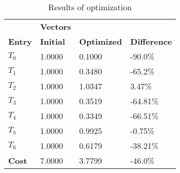 \begin{table}[h!]
\centering
\begin{tabular}{llll}
\textbf{}      & \cellcolor[HTML]{EFEFEF}\textbf{Vectors} & \textbf{} & \textbf{}         \\
\rowcolor[HTML]{EFEFEF} 
\textbf{Entry} & \textbf{Initial} & \textbf{Optimized} & \textbf{Difference} \\
$T_0$ & 1.0000 & 0.1000 & -90.0\% \\ 
$T_1$ & 1.0000 & 0.3480 & -65.2\% \\ 
$T_2$ & 1.0000 & 1.0347 & 3.47\% \\ 
$T_3$ & 1.0000 & 0.3519 & -64.81\% \\ 
$T_4$ & 1.0000 & 0.3349 & -66.51\% \\ 
$T_5$ & 1.0000 & 0.9925 & -0.75\% \\ 
$T_6$ & 1.0000 & 0.6179 & -38.21\% \\ 
\rowcolor[HTML]{EFEFEF} 
\textbf{Cost}  & 7.0000 & 3.7799 & -46.0\% \\ 
\end{tabular}
\caption{Results of optimization}
\label{tab:OptimizationAnalysis}
\end{table}